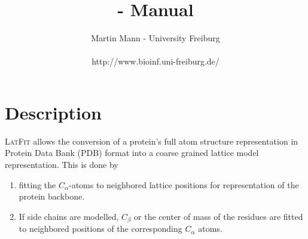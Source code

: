 \documentclass{article}
\title{\latfit{} - Manual}
\date{}
\author{Martin Mann - University Freiburg \\\\
{http://www.bioinf.uni-freiburg.de/}}
\newcommand{\latfit}{\textsc{LatFit}}
\newcommand{\CA}{$C_\alpha$}
\begin{document}
\maketitle



\section{Description}

\latfit{} allows the conversion of a protein's full atom structure
representation in Protein Data Bank (PDB) format into a coarse grained lattice
model representation. This is done by
 
\begin{enumerate}
  \item fitting the \CA-atoms to neighbored lattice positions for
  representation of the protein backbone.
  \item If side chains are modelled, $C_\beta$ or the center of mass of the
  residues are fitted to neighbored positions of the corresponding \CA{}
  atoms.
\end{enumerate}
\end{document}
